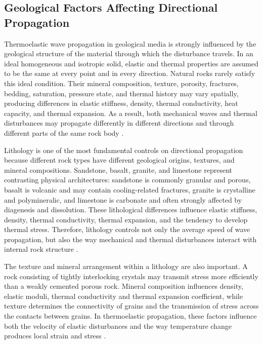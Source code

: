 \subsection{Geological Factors Affecting Directional Propagation}

Thermoelastic wave propagation in geological media is strongly influenced by the geological structure of the material through which the disturbance travels. In an ideal homogeneous and isotropic solid, elastic and thermal properties are assumed to be the same at every point and in every direction. Natural rocks rarely satisfy this ideal condition. Their mineral composition, texture, porosity, fractures, bedding, saturation, pressure state, and thermal history may vary spatially, producing differences in elastic stiffness, density, thermal conductivity, heat capacity, and thermal expansion. As a result, both mechanical waves and thermal disturbances may propagate differently in different directions and through different parts of the same rock body \cite{mavko2009,jaeger2007}.

Lithology is one of the most fundamental controls on directional propagation because different rock types have different geological origins, textures, and mineral compositions. Sandstone, basalt, granite, and limestone represent contrasting physical architectures: sandstone is commonly granular and porous, basalt is volcanic and may contain cooling-related fractures, granite is crystalline and polymineralic, and limestone is carbonate and often strongly affected by diagenesis and dissolution. These lithological differences influence elastic stiffness, density, thermal conductivity, thermal expansion, and the tendency to develop thermal stress. Therefore, lithology controls not only the average speed of wave propagation, but also the way mechanical and thermal disturbances interact with internal rock structure \cite{mavko2009,robertson1988,moore2001}.

The texture and mineral arrangement within a lithology are also important. A rock consisting of tightly interlocking crystals may transmit stress more efficiently than a weakly cemented porous rock. Mineral composition influences density, elastic moduli, thermal conductivity and thermal expansion coefficient, while texture determines the connectivity of grains and the transmission of stress across the contacts between grains. In thermoelastic propagation, these factors influence both the velocity of elastic disturbances and the way temperature change produces local strain and stress \cite{mavko2009,robertson1988}.

